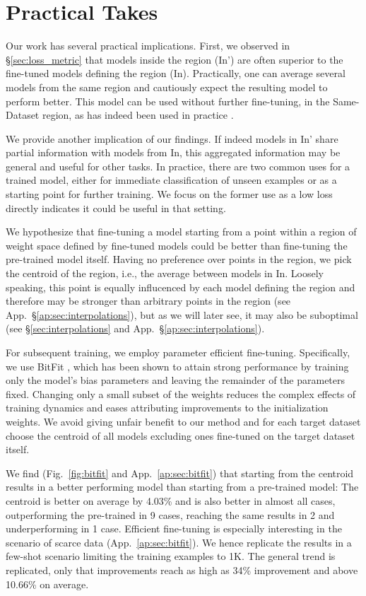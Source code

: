 \documentclass[nohyperref]{article}
\theoremstyle{plain}
\theoremstyle{definition}
\theoremstyle{remark}
\begin{document}
\section{Practical Takes}\label{sec:practical} 
Our work has several practical implications. First, we observed in \S\ref{sec:loss_metric} that models inside the region (In') are often superior to the fine-tuned models defining the region (In). Practically, one can average several models from the same region and cautiously expect the resulting model to perform better. This model can be used without further fine-tuning, in the Same-Dataset region, as has indeed been used in practice \citep[c.f. \S\ref{sec:related};][]{Wortsman2022ModelSA,wortsman2022fi}. 

We provide another implication of our findings. If indeed models in In' share partial information with models from In, this aggregated information may be general and useful for other tasks. In practice, there are two common uses for a trained model, either for immediate classification of unseen examples or as a starting point for further training. We focus on the former use as a low loss directly indicates it could be useful in that setting.

We hypothesize that fine-tuning a model starting from a point within a region of weight space defined by fine-tuned models could be better than fine-tuning the pre-trained model itself. Having no preference over points in the region, we pick the centroid of the region, i.e., the average between models in In. Loosely speaking, this point is equally influcenced by each model defining the region and therefore may be stronger than arbitrary points in the region (see App.~\S\ref{ap:sec:interpolations}), but as we will later see, it may also be suboptimal (see \S\ref{sec:interpolations} and App.~\S\ref{ap:sec:interpolations}).

For subsequent training, we employ parameter efficient fine-tuning. Specifically, we use BitFit \citep{ben-zaken-etal-2022-bitfit}, which has been shown to attain strong performance by training only the model's bias parameters and leaving the remainder of the parameters fixed. Changing only a small subset of the weights reduces the complex effects of training dynamics and eases attributing improvements to the initialization weights. We avoid giving unfair benefit to our method and for each target dataset choose the centroid of all models excluding ones fine-tuned on the target dataset itself. 

We find (Fig.~\ref{fig:bitfit} and App.~\ref{ap:sec:bitfit}) that starting from the centroid results in a better performing model than starting from a pre-trained model: The centroid is better on average by 4.03\% and is also better in almost all cases, outperforming the pre-trained in 9 cases, reaching the same results in 2 and underperforming in 1 case.
Efficient fine-tuning is especially interesting in the scenario of scarce data (App.~\ref{ap:sec:bitfit}). We hence replicate the results in a few-shot scenario limiting the training examples to 1K. The general trend is replicated, only that improvements reach as high as 34\% improvement and above 10.66\% on average.
\end{document}
